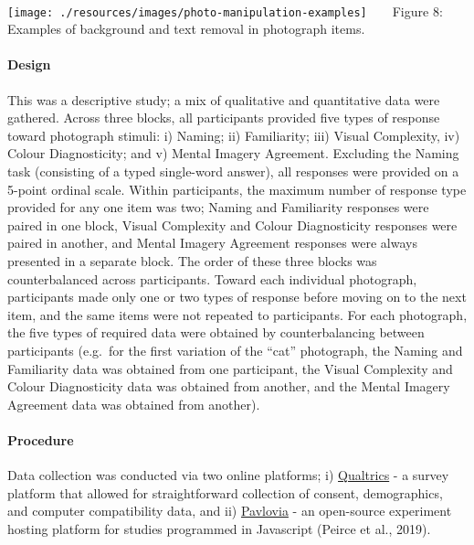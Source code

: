 \documentclass[
  11pt,
]{article}
\begin{document}
~ ~

\texttt{[image: ./resources/images/photo-manipulation-examples]}
~ ~ Figure 8: Examples of background and text removal in photograph
items. ~ ~

\hypertarget{design-1}{%
\paragraph{Design}\label{design-1}}

This was a descriptive study; a mix of qualitative and quantitative data
were gathered. Across three blocks, all participants provided five types
of response toward photograph stimuli: i) Naming; ii) Familiarity; iii)
Visual Complexity, iv) Colour Diagnosticity; and v) Mental Imagery
Agreement. Excluding the Naming task (consisting of a typed single-word
answer), all responses were provided on a 5-point ordinal scale. Within
participants, the maximum number of response type provided for any one
item was two; Naming and Familiarity responses were paired in one block,
Visual Complexity and Colour Diagnosticity responses were paired in
another, and Mental Imagery Agreement responses were always presented in
a separate block. The order of these three blocks was counterbalanced
across participants. Toward each individual photograph, participants
made only one or two types of response before moving on to the next
item, and the same items were not repeated to participants. For each
photograph, the five types of required data were obtained by
counterbalancing between participants (e.g.~for the first variation of
the ``cat'' photograph, the Naming and Familiarity data was obtained
from one participant, the Visual Complexity and Colour Diagnosticity
data was obtained from another, and the Mental Imagery Agreement data
was obtained from another).

\hypertarget{procedure-1}{%
\paragraph{Procedure}\label{procedure-1}}

Data collection was conducted via two online platforms; i)
\href{https://www.qualtrics.com/uk/}{Qualtrics} - a survey platform that
allowed for straightforward collection of consent, demographics, and
computer compatibility data, and ii)
\href{https://pavlovia.org/}{Pavlovia} - an open-source experiment
hosting platform for studies programmed in Javascript (Peirce et al.,
2019).
\end{document}
